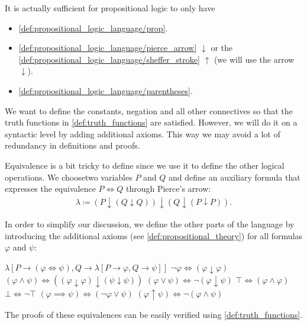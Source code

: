\begin{note}\label{note:minimal_propositional_language}
  It is actually sufficient for propositional logic to only have
  \begin{itemize}
    \item \ref{def:propositional_logic_language/prop}.
    \item \ref{def:propositional_logic_language/pierce_arrow} $\downarrow$ or the \ref{def:propositional_logic_language/sheffer_stroke} $\uparrow$ (we will use the arrow $\downarrow$).
    \item \ref{def:propositional_logic_language/parentheses}.
  \end{itemize}

  We want to define the constants, negation and all other connectives so that the truth functions in \cref{def:truth_functions} are satisfied. However, we will do it on a syntactic level by adding additional axioms. This way we may avoid a lot of redundancy in definitions and proofs.

  Equivalence is a bit tricky to define since we use it to define the other logical operations. We choose\AOC two variables $P$ and $Q$ and define an auxiliary formula that expresses the equivalence $P \iff Q$ through Pierce's arrow:
  \begin{align*}
    \lambda \coloneqq (P \downarrow (Q \downarrow Q)) \downarrow (Q \downarrow (P \downarrow P)).
  \end{align*}

  In order to simplify our discussion, we define the other parts of the language by introducing the additional axioms (see \cref{def:propositional_theory}) for all formulas $\varphi$ and $\psi$:
  \begin{description}
     $\lambda[P \to (\varphi \iff \psi), Q \to \lambda[P \to \varphi, Q \to \psi]]$
     $\neg \varphi \iff (\varphi \downarrow \varphi)$
     $(\varphi \land \psi) \iff ((\varphi \downarrow \varphi) \downarrow (\psi \downarrow \psi))$
     $(\varphi \lor \psi) \iff \neg (\varphi \downarrow \psi)$
     $\top \iff (\varphi \land \varphi)$
     $\bot \iff \neg \top$
     $(\varphi \implies \psi) \iff (\neg \varphi \lor \psi)$
     $(\varphi \uparrow \psi) \iff \neg (\varphi \land \psi)$
  \end{description}

  The proofs of these equivalences can be easily verified using \cref{def:truth_functions}.
\end{note}

